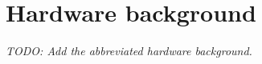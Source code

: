 \chapter{Hardware background}\label{chap:background}

\emph{TODO: Add the abbreviated hardware background.}
